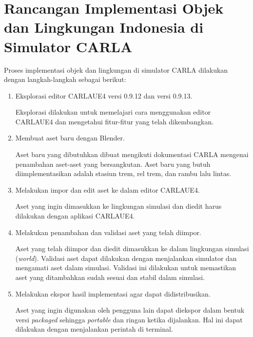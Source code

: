 \section{Rancangan Implementasi Objek dan Lingkungan Indonesia di Simulator CARLA}

Proses implementasi objek dan lingkungan di simulator CARLA dilakukan dengan
langkah-langkah sebagai berikut:

\begin{enumerate}

	\item Eksplorasi editor CARLAUE4 versi 0.9.12 dan versi 0.9.13.

	Eksplorasi dilakukan untuk memelajari cara menggunakan editor CARLAUE4 dan
	mengetahui fitur-fitur yang telah dikembangkan.

	\item Membuat aset baru dengan Blender.

	Aset baru yang dibutuhkan dibuat mengikuti dokumentasi CARLA mengenai
	penambahan aset-aset yang bersangkutan. Aset baru yang butuh
	diimplementasikan adalah stasiun trem, rel trem, dan rambu lalu lintas.

	\item Melakukan impor dan edit aset ke dalam editor CARLAUE4.

	Aset yang ingin dimasukkan ke lingkungan simulasi dan diedit harus dilakukan
	dengan aplikasi CARLAUE4.




	\item Melakukan penambahan dan validasi aset yang telah diimpor.

	Aset yang telah diimpor dan diedit dimasukkan ke dalam lingkungan simulasi
	(\textit{world}). Validasi aset dapat dilakukan dengan menjalankan simulator
	dan mengamati aset dalam simulasi. Validasi ini dilakukan untuk memastikan
	aset yang ditambahkan sudah sesuai dan stabil dalam simulasi.

	\item Melakukan ekspor hasil implementasi agar dapat didistribusikan.

	Aset yang ingin digunakan oleh pengguna lain dapat diekspor dalam bentuk
	versi \textit{packaged} sehingga \textit{portable} dan ringan ketika
	dijalankan. Hal ini dapat dilakukan dengan menjalankan perintah di terminal.

\end{enumerate}
